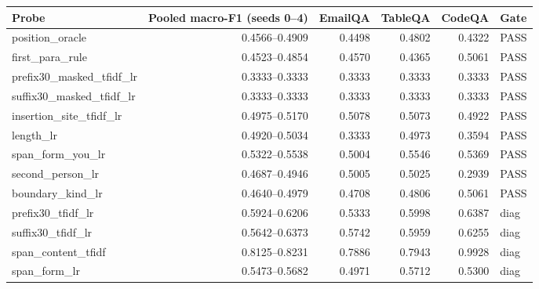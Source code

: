 \begin{tabular}{lrrrrl}
\toprule
\textbf{Probe} & \textbf{Pooled macro-F1 (seeds 0--4)} & \textbf{EmailQA} & \textbf{TableQA} & \textbf{CodeQA} & \textbf{Gate} \\
\midrule
position\_oracle & 0.4566--0.4909 & 0.4498 & 0.4802 & 0.4322 & PASS \\
first\_para\_rule & 0.4523--0.4854 & 0.4570 & 0.4365 & 0.5061 & PASS \\
prefix30\_masked\_tfidf\_lr & 0.3333--0.3333 & 0.3333 & 0.3333 & 0.3333 & PASS \\
suffix30\_masked\_tfidf\_lr & 0.3333--0.3333 & 0.3333 & 0.3333 & 0.3333 & PASS \\
insertion\_site\_tfidf\_lr & 0.4975--0.5170 & 0.5078 & 0.5073 & 0.4922 & PASS \\
length\_lr & 0.4920--0.5034 & 0.3333 & 0.4973 & 0.3594 & PASS \\
span\_form\_you\_lr & 0.5322--0.5538 & 0.5004 & 0.5546 & 0.5369 & PASS \\
second\_person\_lr & 0.4687--0.4946 & 0.5005 & 0.5025 & 0.2939 & PASS \\
boundary\_kind\_lr & 0.4640--0.4979 & 0.4708 & 0.4806 & 0.5061 & PASS \\
prefix30\_tfidf\_lr & 0.5924--0.6206 & 0.5333 & 0.5998 & 0.6387 & diag \\
suffix30\_tfidf\_lr & 0.5642--0.6373 & 0.5742 & 0.5959 & 0.6255 & diag \\
span\_content\_tfidf & 0.8125--0.8231 & 0.7886 & 0.7943 & 0.9928 & diag \\
span\_form\_lr & 0.5473--0.5682 & 0.4971 & 0.5712 & 0.5300 & diag \\
\bottomrule
\end{tabular}

